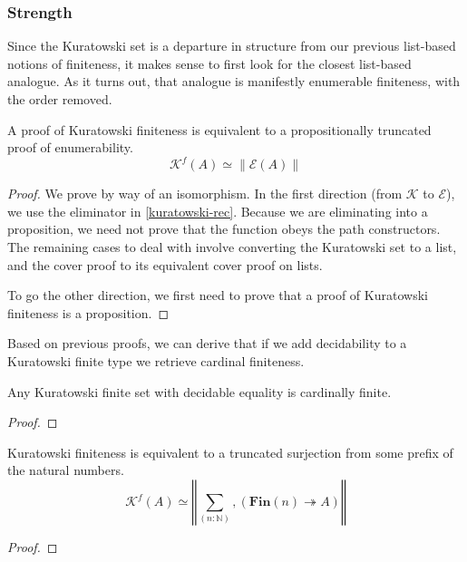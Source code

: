 \begin{refsection}
\subsubsection{Strength}
Since the Kuratowski set is a departure in structure from our previous
list-based notions of finiteness, it makes sense to first look for the closest
list-based analogue.
As it turns out, that analogue is manifestly enumerable finiteness, with the
order removed.
\begin{theorem}
  A proof of Kuratowski finiteness is equivalent to a propositionally truncated
  proof of enumerability.
  \begin{equation}
    \mathcal{K}^f(A) \simeq \lVert \mathcal{E}(A) \rVert
  \end{equation}
\end{theorem}
\begin{proof}
  We prove by way of an isomorphism.
  In the first direction (from \(\mathcal{K}\) to \(\mathcal{E}\)), we use the
  eliminator in \ref{kuratowski-rec}.
  Because we are eliminating into a proposition, we need not prove that the
  function obeys the path constructors.
  The remaining cases to deal with involve converting the Kuratowski set to a
  list, and the cover proof to its equivalent cover proof on lists.

  To go the other direction, we first need to prove that a proof of Kuratowski
  finiteness is a proposition.
\end{proof}
Based on previous proofs, we can derive that if we add decidability to a
Kuratowski finite type we retrieve cardinal finiteness.
\begin{lemma}
  Any Kuratowski finite set with decidable equality is cardinally finite.
\end{lemma}
\begin{proof}
\end{proof}
\begin{lemma}
  Kuratowski finiteness is equivalent to a truncated surjection from some prefix
  of the natural numbers.
  \begin{equation}
    \mathcal{K}^f(A) \simeq \left\Vert \sum_{(n : \mathbb{N})} , \left(  \mathbf{Fin}(n) \twoheadrightarrow A \right) \right\Vert
  \end{equation}
\end{lemma}
\begin{proof}
\end{proof}

\end{refsection}
